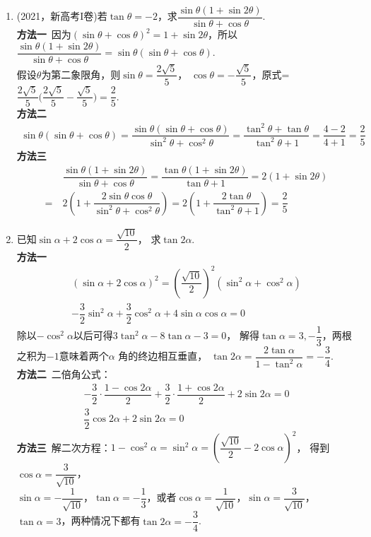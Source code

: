 \begin{enumerate}[label={【\textbf{例\thechapter.\arabic*}】},
 leftmargin=\inteval{\myenumleftmargin}pt,
 itemsep=\inteval{\myenumitempsep}pt,
 itemindent=\inteval{\myenumitemindent}pt]
\item (2021，新高考I卷)若$ \tan\theta=-2 $，求$ \dfrac{\sin\theta(1+\sin2\theta)}{
    \sin\theta+\cos\theta} $. \\
\textbf{方法一}\ 因为$ (\sin\theta+\cos\theta)^2=1+\sin2\theta $，所以
$ \dfrac{\sin\theta(1+\sin2\theta)}{\sin\theta+\cos\theta}=
\sin\theta(\sin\theta+\cos\theta) $. \\
假设$ \theta $为第二象限角，则$ \sin\theta=\dfrac{2\sqrt{5}}{5} $，
$ \cos\theta=-\dfrac{\sqrt{5}}{5} $，原式=$ \dfrac{2\sqrt{5}}{5}\Big(
\dfrac{2\sqrt{5}}{5}-\dfrac{\sqrt{5}}{5}\Big)=\dfrac{2}{5} $.\\
\textbf{方法二}\ 
\begin{gather*}
    \sin\theta(\sin\theta+\cos\theta)=\dfrac{\sin\theta(\sin\theta+\cos\theta)}
    {\sin^2\theta+\cos^2\theta}=\dfrac{\tan^2\theta+\tan\theta}{\tan^2\theta+1}
    =\dfrac{4-2}{4+1}=\dfrac{2}{5}
\end{gather*}
\textbf{方法三}\ 
\begin{align*}
    &\ \dfrac{\sin\theta(1+\sin2\theta)}{\sin\theta+\cos\theta} =
    \dfrac{\tan\theta(1+\sin2\theta)}{\tan\theta+1}=2(1+\sin2\theta) \\
    =&\ 2\left(1+\dfrac{2\sin\theta\cos\theta}{\sin^2\theta+
        \cos^2\theta}\right)=
    2\left(1+\dfrac{2\tan\theta}{\tan^2\theta+1}\right)=\dfrac{2}{5}
\end{align*}

\item \label{求tan2a例题}已知$ \sin\alpha+2\cos\alpha=\dfrac{\sqrt{10}}{2} $，
求$ \tan2\alpha $. \\
\textbf{方法一}\ 
\begin{gather*}
    (\sin\alpha+2\cos\alpha)^2=\left(\dfrac{\sqrt{10}}{2} \right)^2(\sin^2\alpha+\cos^2\alpha)  \\
    -\dfrac{3}{2}\sin^2\alpha+\dfrac{3}{2}\cos^2\alpha+4\sin\alpha \cos\alpha=0  
\end{gather*}
除以$ -\cos^2\alpha $以后可得$ 3\tan^2\alpha-8\tan\alpha-3=0 $，
解得$ \tan\alpha=3,-\dfrac{1}{3} $，两根之积为$ -1 $意味着两个$ \alpha $ 
角的终边相互垂直， $\tan2\alpha=\dfrac{2\tan \alpha}{1-\tan^2\alpha}=-\dfrac{3}{4} $. \\
\textbf{方法二}\ 二倍角公式：
\begin{gather*}
    -\dfrac{3}{2}\cdot\dfrac{1-\cos2\alpha}{2}+\dfrac{3}{2}\cdot\dfrac{1+\cos2\alpha}{2}
    +2\sin2\alpha=0  \\
    \dfrac{3}{2}\cos2\alpha+2\sin2\alpha=0 
\end{gather*}
\textbf{方法三}\ 解二次方程：$ 1-\cos^2\alpha=\sin^2\alpha=
\left(\dfrac{\sqrt{10}}{2}-2\cos\alpha \right)^2 $，
得到$ \cos\alpha=\dfrac{3}{\sqrt{10}} $，\\
$ \sin\alpha=-\dfrac{1}{\sqrt{10}} $，$\tan\alpha=-\dfrac{1}{3} $，或者$ \cos\alpha=\dfrac{1}{\sqrt{10}}$，$\sin\alpha=\dfrac{3}{\sqrt{10}}$， $\tan\alpha=3 $，两种情况下都有$ \tan2\alpha=-\dfrac{3}{4} $. 


\end{enumerate}
